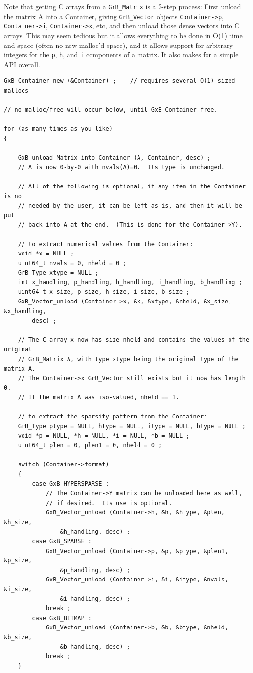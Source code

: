 Note that getting C arrays from a \verb'GrB_Matrix' is a 2-step process:
First unload the matrix A into a Container, giving \verb'GrB_Vector' objects
\verb'Container->p',
\verb'Container->i', \verb'Container->x', etc, and then unload those dense vectors into
C arrays.  This may seem tedious but it allows everything to be done in
O(1) time and space (often no new malloc'd space), and it allows support for
arbitrary integers for the \verb'p', \verb'h', and \verb'i' components of a matrix.
It also makes for a simple API overall.

{\footnotesize
\begin{verbatim}
GxB_Container_new (&Container) ;    // requires several O(1)-sized mallocs

// no malloc/free will occur below, until GxB_Container_free.

for (as many times as you like)
{

    GxB_unload_Matrix_into_Container (A, Container, desc) ;
    // A is now 0-by-0 with nvals(A)=0.  Its type is unchanged.

    // All of the following is optional; if any item in the Container is not
    // needed by the user, it can be left as-is, and then it will be put
    // back into A at the end.  (This is done for the Container->Y).

    // to extract numerical values from the Container:
    void *x = NULL ;
    uint64_t nvals = 0, nheld = 0 ;
    GrB_Type xtype = NULL ;
    int x_handling, p_handling, h_handling, i_handling, b_handling ;
    uint64_t x_size, p_size, h_size, i_size, b_size ;
    GxB_Vector_unload (Container->x, &x, &xtype, &nheld, &x_size, &x_handling,
        desc) ;

    // The C array x now has size nheld and contains the values of the original
    // GrB_Matrix A, with type xtype being the original type of the matrix A.
    // The Container->x GrB_Vector still exists but it now has length 0.
    // If the matrix A was iso-valued, nheld == 1.

    // to extract the sparsity pattern from the Container:
    GrB_Type ptype = NULL, htype = NULL, itype = NULL, btype = NULL ;
    void *p = NULL, *h = NULL, *i = NULL, *b = NULL ;
    uint64_t plen = 0, plen1 = 0, nheld = 0 ;

    switch (Container->format)
    {
        case GxB_HYPERSPARSE :
            // The Container->Y matrix can be unloaded here as well,
            // if desired.  Its use is optional.
            GxB_Vector_unload (Container->h, &h, &htype, &plen, &h_size,
                &h_handling, desc) ;
        case GxB_SPARSE :
            GxB_Vector_unload (Container->p, &p, &ptype, &plen1, &p_size,
                &p_handling, desc) ;
            GxB_Vector_unload (Container->i, &i, &itype, &nvals, &i_size,
                &i_handling, desc) ;
            break ;
        case GxB_BITMAP :
            GxB_Vector_unload (Container->b, &b, &btype, &nheld, &b_size,
                &b_handling, desc) ;
            break ;
    }


\end{verbatim}}
